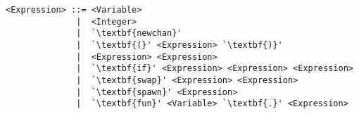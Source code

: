 \begin{BVerbatim}[commandchars=\\\{\}]
<Expression> ::= <Variable> 
              |  <Integer>
              |  `\textbf{newchan}'
              |  `\textbf{(}' <Expression> `\textbf{)}'
              |  <Expression> <Expression>
              |  `\textbf{if}' <Expression> <Expression> <Expression>
              |  `\textbf{swap}' <Expression> <Expression>
              |  `\textbf{spawn}' <Expression>
              |  `\textbf{fun}' <Variable> `\textbf{.}' <Expression>
\end{BVerbatim}
